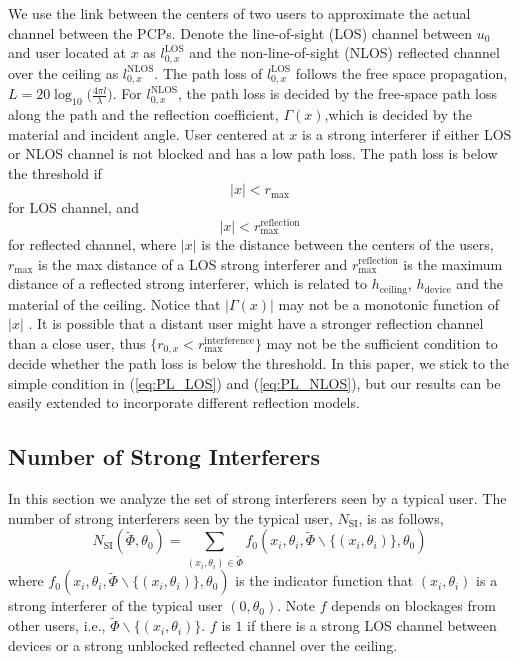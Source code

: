 \documentclass[10pt, conference, letterpaper]{IEEEtran}
\begin{document}
We use the link between the centers of two users to approximate the actual channel between the PCPs. Denote the line-of-sight (LOS) channel between $u_0$ and user located at $x$ as $l_{0,x}^{\mathrm{LOS}}$ and the non-line-of-sight (NLOS) reflected channel over the ceiling as $l_{0,x}^{\mathrm{NLOS}}$. The path loss of $l_{0,x}^{\mathrm{LOS}}$ follows the free space propagation, $L = 20\log_{10}\big(\frac{4\pi l}{\lambda}\big)$. For $l_{0,x}^{\mathrm{NLOS}}$, the path loss is decided by the free-space path loss along the path and the reflection coefficient, $\Gamma(x)$,which is decided by the material and incident angle. User centered at $x$ is a strong interferer if either LOS or NLOS channel is not blocked and has a low path loss. The path loss is below the threshold if  
\begin{equation}\label{eq:PL_LOS}
|x| < r_{\max}
\end{equation}
for LOS channel, and 
\begin{equation}\label{eq:PL_NLOS}
|x| < r_{\max}^{\mathrm{reflection}}
\end{equation}
for reflected channel, where $|x|$ is the distance between the centers of the users, $r_{\max}$ is the max distance of a LOS strong interferer and $r_{\max}^{\mathrm{reflection}}$ is the maximum distance of a reflected strong interferer, which is related to $h_{\mathrm{ceiling}}$, $h_{\mathrm{device}}$ and the material of the ceiling. Notice that $|\Gamma(x)|$ may not be a monotonic function of $|x|$ \cite{reflection}. It is possible that a distant user might have a stronger reflection channel than a close user, thus $\{r_{0,x}<r_{\max}^{\mathrm{interference}}\}$ may not be the sufficient condition to decide whether the path loss is below the threshold. In this paper, we stick to the simple condition in (\ref{eq:PL_LOS}) and (\ref{eq:PL_NLOS}), but our results can be easily extended to incorporate different reflection models.


\subsection{Number of Strong Interferers}
In this section we analyze the set of strong interferers seen by a typical user. The number of strong interferers seen by the typical user, $N_{\mathrm{SI}}$, is as follows, 
\begin{equation}
N_{\mathrm{SI}}(\tilde{\Phi}, \theta_0) = \sum_{(x_i, \theta_i)\in \tilde{\Phi}}f_0(x_i, \theta_i, \tilde{\Phi}\backslash\{(x_i,\theta_i)\}, \theta_0)
\end{equation}
where $f_0(x_i, \theta_i, \tilde{\Phi}\backslash\{(x_i,\theta_i)\}, \theta_0)$ is the indicator function that $(x_i, \theta_i)$ is a strong interferer of the typical user $(0,\theta_0)$. Note $f$ depends on blockages from other users, i.e., $\tilde{\Phi}\backslash\{(x_i,\theta_i)\}$. $f$ is $1$ if there is a strong LOS channel between devices or a strong unblocked reflected channel over the ceiling.
\end{document}
